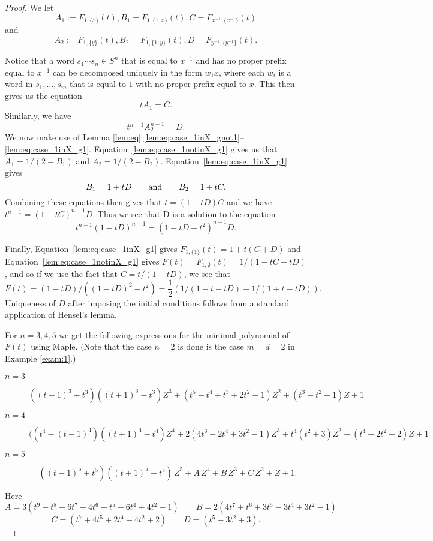 \documentclass[11pt]{amsart}
\theoremstyle{definition}
\begin{document}
\begin{proof}
We let
\begin{equation}
A_1:=F_{1,\{x\}}(t), B_1=F_{1,\{1,x\}}(t), C=F_{x^{-1},\{x^{-1}\}}(t)
\end{equation}
and
\begin{equation}
A_2:=F_{1,\{y\}}(t), B_2=F_{1,\{1,y\}}(t), D=F_{y^{-1},\{y^{-1}\}}(t).
\end{equation}

Notice that a word $s_1\cdots s_n\in S^n$ that is equal to $x^{-1}$ and has no proper prefix equal to $x^{-1}$ can be decomposed uniquely in the form
$w_1 x$, where each $w_i$ is a word in $s_1,\ldots ,s_m$ that is equal to $1$ with no proper prefix equal to $x$.  This then gives us the equation
\begin{equation}
\label{eq:AA}
t A_1 = C.
\end{equation}
Similarly, we have
\begin{equation}
\label{eq:AAA}
t^{n-1} A_2^{n-1} = D.
\end{equation}
We now make use of Lemma \ref{lem:eq} \eqref{lem:eq:case_1inX_gnot1}--\eqref{lem:eq:case_1inX_g1}.
Equation~\eqref{lem:eq:case_1notinX_g1} gives us that 
$A_1=1/(2-B_1)$ and $A_2=1/(2-B_2)$.  Equation~\eqref{lem:eq:case_1inX_g1} gives
\begin{equation}
\label{eq:BBB}
B_1=1+t D\qquad {\rm and}\qquad B_2=1+tC.\end{equation}
Combining these equations then gives that
$t =(1-tD) C$ and we have
$t^{n-1} = (1-tC)^{n-1} D$.
Thus we see that D is a solution to the equation
$$t^{n-1}(1-tD)^{n-1} = (1-tD-t^2)^{n-1} D.$$

Finally, Equation~\eqref{lem:eq:case_1inX_g1} gives $F_{1,\{1\}}(t) = 1+ t (C+D)$ and Equation~\eqref{lem:eq:case_1notinX_g1} gives $F(t)=F_{1,\emptyset}(t)=1/(1-tC-tD)$,
and so if we use the fact that $C=t/(1-tD)$, we see that
$$F(t)=(1-tD)/((1-tD)^2-t^2) = \frac{1}{2}\left(1/(1-t-tD) + 1/(1+t-tD)\right).$$
Uniqueness of $D$ after imposing the initial conditions follows from a standard application of Hensel's lemma.

For $n=3,4,5$ we get the following expressions for the minimal polynomial of $F(t)$ using Maple.  (Note that the case $n=2$ is done is the case $m=d=2$ in Example \ref{exam:1}.)
\begin{description}
\item[$n=3$]
\[((t-1)^3+t^3)((t+1)^3-t^3)Z^3+(t^5-t^4+t^3+2t^2-1)Z^2+(t^3-t^2+1)Z+1\]
\item[$n=4$]
\[((t^4-(t-1)^4)((t+1)^4-t^4)Z^4+2(4t^6-2t^4+3t^2-1)Z^3+t^4(t^2+3)Z^2+(t^4-2t^2+2)Z+1\]
\item[$n=5$]
\[((t-1)^5+t^5)((t+1)^5-t^5)\,Z^5
+A\,Z^4 +B\,Z^3+C\,Z^2
+Z+1.\]
\end{description}
Here
\[A=3(t^9-t^8+6t^7+4t^6+t^5-6t^4+4t^2-1)\qquad B=2(4t^7+t^6+3t^5-3t^4+3t^2-1)\]
\[C=(t^7+4t^5+2t^4-4t^2+2) \qquad D=(t^5-3t^2+3).\]


\end{proof}
\end{document}
